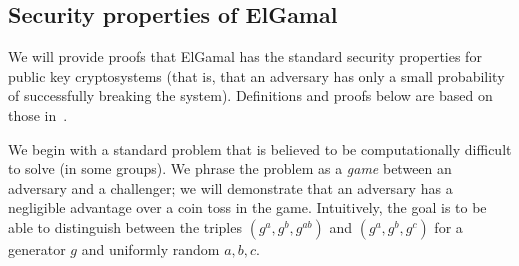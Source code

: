 \documentclass[12pt,a4paper]{article}
\theoremstyle{definition}
\begin{document}
\subsection{Security properties of ElGamal}
We will provide proofs that ElGamal has the standard security properties for public key cryptosystems (that is, that an adversary has only a small probability of successfully breaking the system). Definitions and proofs below are based on those in~\cite{katz2014introduction}.

We begin with a standard problem that is believed to be computationally difficult to solve (in some groups). We phrase the problem as a \textit{game} between an adversary and a challenger; we will demonstrate that an adversary has a negligible advantage over a coin toss in the game. Intuitively, the goal is to be able to distinguish between the triples $(g^a, g^b, g^{ab})$ and $(g^a, g^b, g^c)$ for  a generator $g$ and uniformly random $a, b, c$.
\end{document}
